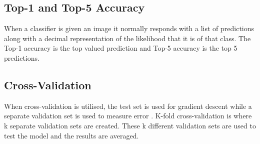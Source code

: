 
		




\subsection*{Top-1 and Top-5 Accuracy}
When a classifier is given an image it normally responds with a list of
predictions along with a decimal representation of the likelihood that it is of
that class. The Top-1 accuracy is the top valued prediction and Top-5 accuracy
is the top 5 predictions.

\subsection*{Cross-Validation}
When cross-validation is utilised, the test set is used for gradient descent while a separate validation set is used to measure error \parencite{MLANN}.
K-fold cross-validation is where k separate validation sets are created.
These k different validation sets are used to test the model and the results are averaged.

